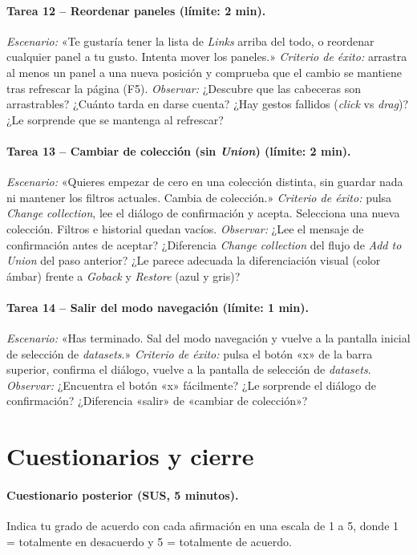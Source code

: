 \paragraph{Tarea 12 -- Reordenar paneles (límite: 2 min).}
\textit{Escenario:} «Te gustaría tener la lista de \textit{Links} arriba del todo, o
reordenar cualquier panel a tu gusto. Intenta mover los paneles.»
\textit{Criterio de éxito:} arrastra al menos un panel a una nueva posición y comprueba que
el cambio se mantiene tras refrescar la página (F5).
\textit{Observar:} ¿Descubre que las cabeceras son arrastrables? ¿Cuánto tarda en darse
cuenta? ¿Hay gestos fallidos (\textit{click} vs \textit{drag})? ¿Le sorprende que se mantenga
al refrescar?

\paragraph{Tarea 13 -- Cambiar de colección (sin \textit{Union}) (límite: 2 min).}
\textit{Escenario:} «Quieres empezar de cero en una colección distinta, sin guardar nada
ni mantener los filtros actuales. Cambia de colección.»
\textit{Criterio de éxito:} pulsa \textit{Change collection}, lee el diálogo de confirmación
y acepta. Selecciona una nueva colección. Filtros e historial quedan vacíos.
\textit{Observar:} ¿Lee el mensaje de confirmación antes de aceptar? ¿Diferencia
\textit{Change collection} del flujo de \textit{Add to Union} del paso anterior? ¿Le parece
adecuada la diferenciación visual (color ámbar) frente a \textit{Goback} y \textit{Restore}
(azul y gris)?

\paragraph{Tarea 14 -- Salir del modo navegación (límite: 1 min).}
\textit{Escenario:} «Has terminado. Sal del modo navegación y vuelve a la pantalla
inicial de selección de \textit{datasets}.»
\textit{Criterio de éxito:} pulsa el botón «x» de la barra superior, confirma el
diálogo, vuelve a la pantalla de selección de \textit{datasets}.
\textit{Observar:} ¿Encuentra el botón «x» fácilmente? ¿Le sorprende el diálogo de
confirmación? ¿Diferencia «salir» de «cambiar de colección»?

\section{Cuestionarios y cierre}

\paragraph{Cuestionario posterior (SUS, 5 minutos).}
Indica tu grado de acuerdo con cada afirmación en una escala de 1 a 5, donde 1 = totalmente
en desacuerdo y 5 = totalmente de acuerdo.

